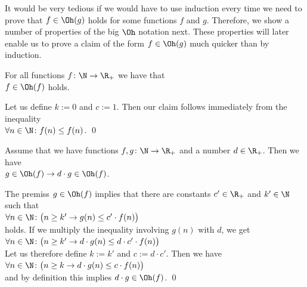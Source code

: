 It would be very tedious if we would have to use induction every time we need to prove that 
$f \in \Oh(g)$ holds for some functions $f$ and $g$.   Therefore, we show a number of properties of
the big $\Oh$ notation next.  These properties will later enable us to prove a claim of the form 
$f \in \Oh(g)$ much quicker than by induction.

\begin{Proposition} 
  For all functions $f\colon \N \rightarrow {\R_+}$ we have that
  \\[0.2cm]
  \hspace*{1.3cm} $f \in \Oh(f)$ \quad holds. 
\end{Proposition}

\proof
Let us define $k:=0$ and $c:=1$.  Then our claim  follows immediately from the inequality 
\\[0.2cm]
\hspace*{1.3cm}
$\forall n \in \N\colon f(n) \leq f(n)$. \qed

\begin{Proposition} \hspace*{\fill} \linebreak
Assume that we have functions  $f,g\colon \N \rightarrow {\R_+}$ and a number $d \in \R_+$.  Then we
have 
\\[0.2cm]
\hspace*{1.3cm}
 $g \in \Oh(f) \rightarrow d \cdot g \in \Oh(f)$.
\end{Proposition}

\proof
The premiss $g \in \Oh(f)$ implies that there are constants $c'\in \R_+$ and $k'\in \N$ 
such that \\[0.2cm]
\hspace*{1.3cm} 
$\forall n \in \N \colon \bigl(n \geq k'  \rightarrow g(n) \leq c' \cdot f(n)\bigr)$ 
\\[0.2cm]
holds.  If we multiply the inequality involving $g(n)$ with $d$, we get \\[0.2cm]
\hspace*{1.3cm} 
$\forall n \in \N \colon\bigl( n \geq k'  \rightarrow d \cdot g(n) \leq d \cdot c' \cdot f(n)\bigr)$ 
\\[0.2cm]
Let us therefore define $k:=k'$ and $c := d \cdot c'$.  Then we have \\[0.2cm]
\hspace*{1.3cm}
$\forall n \in \N \colon \bigl(n \geq k  \rightarrow d \cdot g(n) \leq c \cdot f(n)\bigr)$ 
\\[0.2cm]
and by definition this implies $d \cdot g \in \Oh(f)$. \qed
\vspace*{0.2cm}

